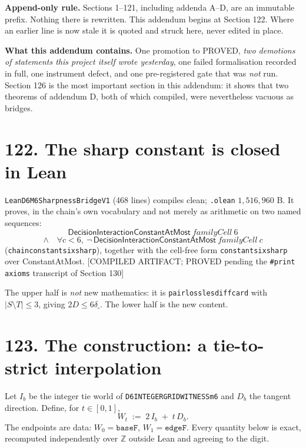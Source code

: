 \documentclass[9pt,twocolumn]{article}
\newcommand{\eclass}[1]{\textsf{[#1]}}
\renewcommand{\_}{\CIGunderscore\allowbreak}
\begin{document}
\sloppy
{}

\textbf{Append-only rule.} Sections 1--121, including addenda A--D, are an immutable prefix. Nothing there is rewritten. This addendum begins at Section 122. Where an earlier line is now stale it is quoted and struck here, never edited in place.

\textbf{What this addendum contains.} One promotion to PROVED, \emph{two demotions of statements this project itself wrote yesterday}, one failed formalisation recorded in full, one instrument defect, and one pre-registered gate that was \emph{not} run. Section 126 is the most important section in this addendum: it shows that two theorems of addendum D, both of which compiled, were nevertheless vacuous as bridges.

\section*{122. The sharp constant is closed in Lean}
\texttt{LeanD6M6SharpnessBridgeV1} (468 lines) compiles clean; \texttt{.olean} $1{,}516{,}960$ B. It proves, in the chain's own vocabulary and not merely as arithmetic on two named sequences:
\[\textsf{DecisionInteractionConstantAtMost}\ \textit{familyCell}\ 6\]
\[\wedge\quad \forall c<6,\ \neg\,\textsf{DecisionInteractionConstantAtMost}\ \textit{familyCell}\ c\]
(\texttt{chain\_constant\_six\_sharp}), together with the cell-free form \texttt{constant\_six\_sharp} over \textsf{ConstantAtMost}. \eclass{COMPILED ARTIFACT; PROVED pending the \texttt{\#print axioms} transcript of Section 130}

The upper half is \emph{not} new mathematics: it is \texttt{pair\_loss\_le\_sdiff\_card} with $|S\setminus T|\le 3$, giving $2D\le 6\delta_\square$. The lower half is the new content.

\section*{123. The construction: a tie-to-strict interpolation}
Let $I_b$ be the integer tie world of \texttt{D6\_INTEGER\_GRID\_WITNESS\_m6} and $D_b$ the tangent direction. Define, for $t\in[0,1]$,
\[W_t \;:=\; 2\,I_b \;+\; t\,D_b .\]
The endpoints are data: $W_0=\texttt{baseF}$, $W_1=\texttt{edgeF}$. Every quantity below is exact, recomputed independently over $\mathbb{Z}$ outside Lean and agreeing to the digit.
\end{document}
